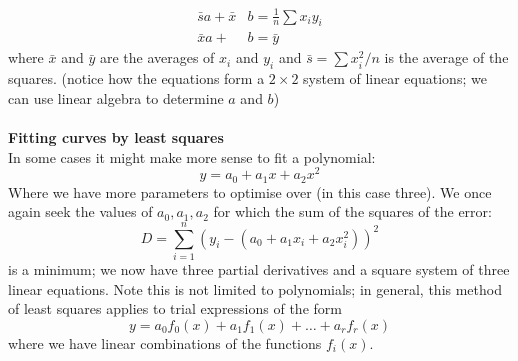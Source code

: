 \documentclass{report}
\begin{document}
\begin{align*}
\bar{s}a+\bar{x}&b=\frac{1}{n}\sum x_iy_i\\
\bar{x}a+&b=\bar{y}
\end{align*}
where $\bar{x}$ and $\bar{y}$ are the averages of $x_i$ and $y_i$ and $\bar{s}=\sum x_i^2/n$ is the average 
of the squares. (notice how the equations form a $2\times2$ system of linear equations; we can use linear algebra
to determine $a$ and $b$)\\
\vspace{1mm}\\
\textbf{Fitting curves by least squares}\\
In some cases it might make more sense to fit a polynomial:\begin{equation*}
y=a_0+a_1x+a_2x^2
\end{equation*}
Where we have more parameters to optimise over (in this case three). We once again seek the values of 
$a_0,a_1,a_2$ for which the sum of the squares of the error:
\begin{equation*}
D=\sum^n_{i=1}(y_i-(a_0+a_1x_i+a_2x_i^2))^2
\end{equation*}
is a minimum; we now have three partial derivatives and a square system of three linear equations.
Note this is not limited to polynomials; in general, this method of least squares applies to 
trial expressions of the form
\begin{equation*}
y=a_0f_0(x)+a_1f_1(x)+\ldots+a_rf_r(x)
\end{equation*}
where we have linear combinations of the functions $f_i(x)$.
\newpage
\end{document}
